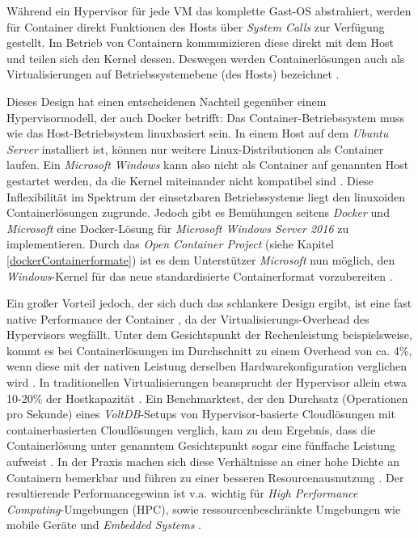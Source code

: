 \documentclass[../main.tex]{subfiles}
\begin{document}
      Während ein Hypervisor für jede \acrshort{VM} das komplette Gast-\acrshort{OS} abstrahiert, werden für Container direkt Funktionen des Hosts über \emph{System Calls} zur Verfügung gestellt. Im Betrieb von Containern kommunizieren diese direkt mit dem Host und teilen sich den Kernel dessen. Deswegen werden Containerlösungen auch als Virtualisierungen auf Betriebssystemebene (des Hosts) bezeichnet \cite[S.6+7]{dockerBook}\cite[S.2]{containerVirtPerformance}\cite[S.3]{dockerLXCKub}.

			Dieses Design hat einen entscheidenen Nachteil gegenüber einem Hypervisormodell, der auch Docker betrifft: Das Container-Betriebssystem muss wie das Host-Betriebsystem linuxbasiert sein. In einem Host auf dem \emph{Ubuntu Server} installiert ist, können nur weitere Linux-Distributionen als Container laufen. Ein \emph{Microsoft Windows} kann also nicht als Container auf genannten Host gestartet werden, da die Kernel miteinander nicht kompatibel sind \cite[S.6]{dockerBook}. Diese Inflexibilität im Spektrum der einsetzbaren Betriebssysteme liegt den linuxoiden Containerlösungen zugrunde. Jedoch gibt es Bemühungen seitens \emph{Docker} und \emph{Microsoft} eine Docker-Lösung für \emph{Microsoft Windows Server 2016} zu implementieren. Durch das \emph{Open Container Project} (siehe Kapitel \ref{dockerContainerformate}) ist es dem Unterstützer \emph{Microsoft} nun möglich, den \emph{Windows}-Kernel für das neue standardisierte Containerformat vorzubereiten \cite{dockerWindowsSupport}.

			Ein großer Vorteil jedoch, der sich duch das schlankere Design ergibt, ist eine fast native Performance der Container \cite[S.1]{containerVirtPerformance}, da der Virtualisierungs-Overhead des Hypervisors wegfällt. Unter dem Gesichtspunkt der Rechenleistung beispielsweise, kommt es bei Containerlösungen im Durchschnitt zu einem Overhead von ca. 4\%, wenn diese mit der nativen Leistung derselben Hardwarekonfiguration verglichen wird \cite[S.4]{containerVirtPerformance}\cite[S.5]{IBMcontVMcomparison}. In traditionellen Virtualisierungen beansprucht der Hypervisor allein etwa 10-20\% der Hostkapazität \cite[S.2]{dockerIntroIEEE}\cite[S.5]{IBMcontVMcomparison}. Ein Benchmarktest, der den Durchsatz (Operationen pro Sekunde) eines \emph{VoltDB}-Setups\cite{voltdb} von Hypervisor-basierte Cloudlösungen mit containerbasierten \gls{Cloud}lösungen verglich, kam zu dem Ergebnis, dass die Containerlösung unter genanntem Gesichtspunkt sogar eine fünffache Leistung aufweist \cite[S.2+3]{voltdbBenchmark}.
			In der Praxis machen sich diese Verhältnisse an einer hohe Dichte an Containern bemerkbar und führen zu einer besseren Resourcenausnutzung \cite[S.7+8]{dockerBook}. Der resultierende Performancegewinn ist v.a. wichtig für \emph{High Performance Computing}-Umgebungen (\acrshort{HPC}), sowie ressourcenbeschränkte Umgebungen wie mobile Geräte und \emph{Embedded Systems} \cite[S.1]{dockerSec2}.
\end{document}
